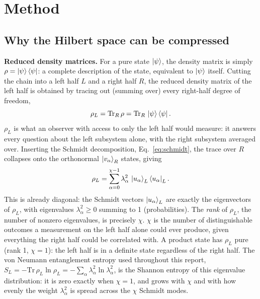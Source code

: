 \documentclass[11pt,a4paper]{article}
\begin{document}
\section{Method}
\label{sec:method}

\subsection{Why the Hilbert space can be compressed}

\textbf{Reduced density matrices.} For a pure state $\ket{\psi}$, the density
matrix is simply $\rho = \ket{\psi}\bra{\psi}$: a complete description of the
state, equivalent to $\ket{\psi}$ itself. Cutting the chain into a left half
$L$ and a right half $R$, the reduced density matrix of the left half is
obtained by tracing out (summing over) every right-half degree of freedom,
\begin{equation}
  \rho_L = \mathrm{Tr}_R\, \rho = \mathrm{Tr}_R\, \ket{\psi}\bra{\psi}.
\end{equation}
$\rho_L$ is what an observer with access to only the left half would measure:
it answers every question about the left subsystem alone, with the right
subsystem averaged over. Inserting the Schmidt decomposition,
Eq.~\eqref{eq:schmidt}, the trace over $R$ collapses onto the orthonormal
$\ket{v_\alpha}_R$ states, giving
\begin{equation}
  \rho_L = \sum_{\alpha=0}^{\chi-1} \lambda_\alpha^2\, \ket{u_\alpha}_L\bra{u_\alpha}_L.
  \label{eq:rho_L}
\end{equation}
This is already diagonal: the Schmidt vectors $\ket{u_\alpha}_L$ are exactly
the eigenvectors of $\rho_L$, with eigenvalues $\lambda_\alpha^2 \geq 0$
summing to 1 (probabilities). The \emph{rank} of $\rho_L$, the number of
nonzero eigenvalues, is precisely $\chi$. $\chi$ is the number of
distinguishable outcomes a measurement on the left half alone could ever
produce, given everything the right half could be
correlated with. A product state has $\rho_L$ pure (rank 1, $\chi=1$): the
left half is in a definite state regardless of the right half. The von
Neumann entanglement entropy used throughout this report,
$S_L = -\mathrm{Tr}\,\rho_L \ln \rho_L = -\sum_\alpha \lambda_\alpha^2 \ln
\lambda_\alpha^2$, is the Shannon entropy of this eigenvalue distribution: it
is zero exactly when $\chi=1$, and grows with $\chi$ and with how evenly the
weight $\lambda_\alpha^2$ is spread across the $\chi$ Schmidt modes.
\end{document}
